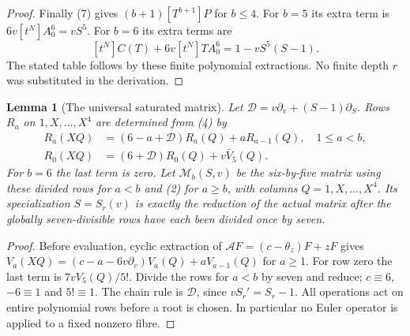 \documentclass[11pt]{article}
\newtheorem{lemma}{Lemma}
\begin{document}
\begin{proof}
Finally (7) gives $(b+1)[T^{b+1}]P$ for $b\le4$.
For $b=5$ its extra term is $6v[t^N]A_0^6=vS^5$.
For $b=6$ its extra terms are
\[
 [t^N]C(T)+6v[t^N]TA_0^6=1-vS^5(S-1).
\]
The stated table follows by these finite polynomial extractions.
No finite depth $r$ was substituted in the derivation.
\end{proof}

\begin{lemma}[The universal saturated matrix]\label{lem:universal-matrix}
Let $\mathscr D=v\partial_v+(S-1)\partial_S$.
Rows $R_a$ on $1,X,\ldots,X^4$ are determined from (4) by
\[
\begin{split}
 R_a(XQ)&=(6-a+\mathscr D)R_a(Q)+aR_{a-1}(Q),
                                      \quad1\le a<b,\\
 R_0(XQ)&=(6+\mathscr D)R_0(Q)+v\bar V_5(Q).
\end{split}                                                   \tag{8}
\]
For $b=6$ the last term is zero.
Let $\mathcal M_b(S,v)$ be the six-by-five matrix using these
divided rows for $a<b$ and (2) for $a\ge b$, with columns
$Q=1,X,\ldots,X^4$.
Its specialization $S=S_r(v)$ is exactly the reduction of the
actual matrix after the globally seven-divisible rows have each
been divided once by seven.
\end{lemma}
\begin{proof}
Before evaluation, cyclic extraction of
$\mathcal A F=(c-\theta_z)F+zF$ gives
$V_a(XQ)=(c-a-6v\partial_v)V_a(Q)+aV_{a-1}(Q)$ for $a\ge1$.
For row zero the last term is $7vV_5(Q)/5!$.
Divide the rows for $a<b$ by seven and reduce; $c\equiv6$,
$-6\equiv1$ and $5!\equiv1$.
The chain rule is $\mathscr D$, since $vS_r'=S_r-1$.
All operations act on entire polynomial rows before a root is chosen.
In particular no Euler operator is applied to a fixed nonzero fibre.
\end{proof}
\end{document}
